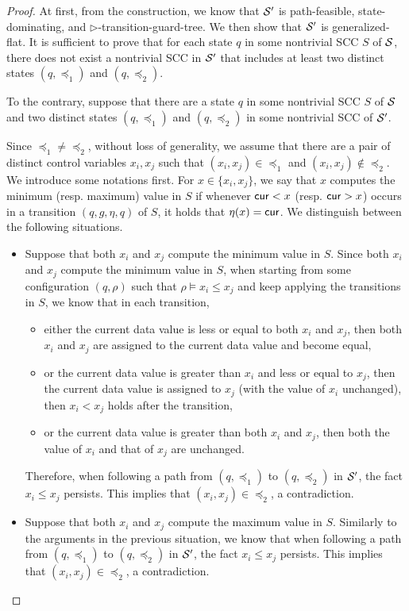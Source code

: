\begin{appendix}
\begin{proof}
At first, from the construction, we know that ${\mathcal{S} }'$ is path-feasible, state-dominating, and $\triangleright$-transition-guard-tree. We then show that ${\mathcal{S} }'$ is generalized-flat. It is sufficient to prove that for each state $q$ in some nontrivial SCC $S$ of ${\mathcal{S} }$, there does not exist a nontrivial SCC in ${\mathcal{S} }'$ that includes at least two distinct states $(q, \preceq_1)$ and $(q, \preceq_2)$.

To the contrary, suppose that there are a state $q$ in some nontrivial SCC $S$ of ${\mathcal{S} }$ and two distinct states $(q, \preceq_1)$ and $(q, \preceq_2)$ in some nontrivial SCC of ${\mathcal{S} }'$.

Since $\preceq_1 \neq \preceq_2$, without loss of generality, we assume that there are a pair of distinct control variables $x_i, x_j$ such that $(x_i, x_j) \in \preceq_1$ and $(x_i, x_j) \not \in \preceq_2$. 
We introduce some notations first. For $x \in \{x_i, x_j\}$, we say that $x$ computes the minimum (resp. maximum) value in $S$ if whenever $\mathsf{cur} < x$ (resp. $\mathsf{cur} > x$) occurs in a transition $(q, g, \eta, q)$ of $S$, it holds that $\eta(x)=\mathsf{cur}$. 
We distinguish between the following situations.
\begin{itemize}
\item Suppose that both $x_i$ and $x_j$ compute the minimum value in $S$. Since both $x_i$ and $x_j$ compute the minimum value in $S$, when starting from some configuration $(q, \rho)$ such that $\rho \models x_i \le x_j$ and keep applying the transitions in $S$, we know that in each transition, 
\begin{itemize}
\item either the current data value is less or equal to both $x_i$ and $x_j$, then both $x_i$ and $x_j$ are assigned to the current data value and become equal, 
%
\item or the current data value is greater than $x_i$ and less or equal to $x_j$, then the current data value is assigned to $x_j$ (with the value of $x_i$ unchanged), then $x_i < x_j$ holds after the transition,
%
\item or the current data value is greater than both $x_i$ and $x_j$, then both the value of $x_i$ and that of $x_j$ are unchanged.
\end{itemize}
Therefore, when following a path from $(q, \preceq_1)$ to $(q, \preceq_2)$ in ${\mathcal{S} }'$, the fact $x_i \le x_j$ persists. This implies that $(x_i, x_j) \in \preceq_2$, a contradiction.
%
\item Suppose that both $x_i$ and $x_j$ compute the maximum value in $S$. Similarly to the arguments in the previous situation, we know that when following a path from $(q, \preceq_1)$ to $(q, \preceq_2)$ in ${\mathcal{S} }'$, the fact $x_i \le x_j$ persists. This implies that $(x_i, x_j) \in \preceq_2$, a contradiction.

\end{itemize}
\end{proof}
\end{appendix}
